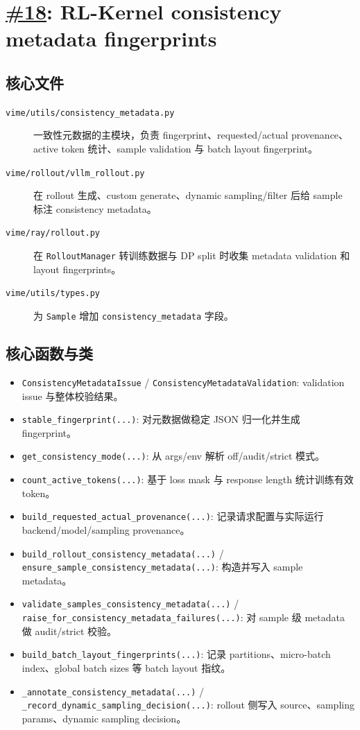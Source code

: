 \documentclass[11pt,a4paper]{ctexart}
\newcommand{\code}[1]{{\small\nolinkurl{#1}}}
\newcommand{\pr}[1]{\href{https://github.com/RL-Align/vime/pull/#1}{\##1}}
\newcommand{\fileitem}[2]{\item[\code{#1}] #2}
\begin{document}
\section{\pr{18}: RL-Kernel consistency metadata fingerprints}

\subsection{核心文件}
\begin{description}
  \fileitem{vime/utils/consistency_metadata.py}{一致性元数据的主模块，负责 fingerprint、requested/actual provenance、active token 统计、sample validation 与 batch layout fingerprint。}
  \fileitem{vime/rollout/vllm_rollout.py}{在 rollout 生成、custom generate、dynamic sampling/filter 后给 sample 标注 consistency metadata。}
  \fileitem{vime/ray/rollout.py}{在 \code{RolloutManager} 转训练数据与 DP split 时收集 metadata validation 和 layout fingerprints。}
  \fileitem{vime/utils/types.py}{为 \code{Sample} 增加 \code{consistency_metadata} 字段。}
\end{description}

\subsection{核心函数与类}
\begin{itemize}
  \item \code{ConsistencyMetadataIssue} / \code{ConsistencyMetadataValidation}: validation issue 与整体校验结果。
  \item \code{stable_fingerprint(...)}: 对元数据做稳定 JSON 归一化并生成 fingerprint。
  \item \code{get_consistency_mode(...)}: 从 args/env 解析 off/audit/strict 模式。
  \item \code{count_active_tokens(...)}: 基于 loss mask 与 response length 统计训练有效 token。
  \item \code{build_requested_actual_provenance(...)}: 记录请求配置与实际运行 backend/model/sampling provenance。
  \item \code{build_rollout_consistency_metadata(...)} / \code{ensure_sample_consistency_metadata(...)}: 构造并写入 sample metadata。
  \item \code{validate_samples_consistency_metadata(...)} / \code{raise_for_consistency_metadata_failures(...)}: 对 sample 级 metadata 做 audit/strict 校验。
  \item \code{build_batch_layout_fingerprints(...)}: 记录 partitions、micro-batch index、global batch sizes 等 batch layout 指纹。
  \item \code{_annotate_consistency_metadata(...)} / \code{_record_dynamic_sampling_decision(...)}: rollout 侧写入 source、sampling params、dynamic sampling decision。
\end{itemize}
\end{document}
